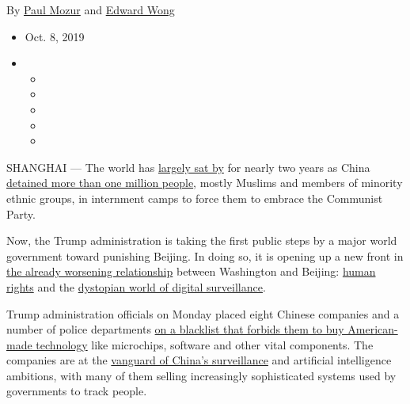 By \href{https://www.nytimes.com/by/paul-mozur}{Paul Mozur} and
\href{https://www.nytimes.com/by/edward-wong}{Edward Wong}

\begin{itemize}
\item
  Oct. 8, 2019
\item
  \begin{itemize}
  \item
  \item
  \item
  \item
  \item
  \end{itemize}
\end{itemize}

SHANGHAI --- The world has
\href{https://www.nytimes.com/2019/09/25/world/asia/china-xinjiang-muslim-camps.html}{largely
sat by} for nearly two years as China
\href{https://www.nytimes.com/2018/09/08/world/asia/china-uighur-muslim-detention-camp.html}{detained
more than one million people}, mostly Muslims and members of minority
ethnic groups, in internment camps to force them to embrace the
Communist Party.

Now, the Trump administration is taking the first public steps by a
major world government toward punishing Beijing. In doing so, it is
opening up a new front in
\href{https://www.nytimes.com/2019/06/26/world/asia/united-states-china-conflict.html}{the
already worsening relationship} between Washington and Beijing:
\href{https://www.nytimes.com/interactive/2019/04/04/world/asia/xinjiang-china-surveillance-prison.html}{human
rights} and the
\href{https://www.nytimes.com/2019/05/22/world/asia/china-surveillance-xinjiang.html}{dystopian
world of digital surveillance}.

Trump administration officials on Monday placed eight Chinese companies
and a number of police departments
\href{https://www.nytimes.com/2019/10/07/us/politics/us-to-blacklist-28-chinese-entities-over-abuses-in-xinjiang.html?rref=collection\%2Fbyline\%2Fpaul-mozur\&action=click\&contentCollection=undefined\&region=stream\&module=stream_unit\&version=latest\&contentPlacement=1\&pgtype=collection}{on
a blacklist that forbids them to buy American-made technology} like
microchips, software and other vital components. The companies are at
the
\href{https://www.nytimes.com/2018/07/08/business/china-surveillance-technology.html}{vanguard
of China's surveillance} and artificial intelligence ambitions, with
many of them selling increasingly sophisticated systems used by
governments to track people.


